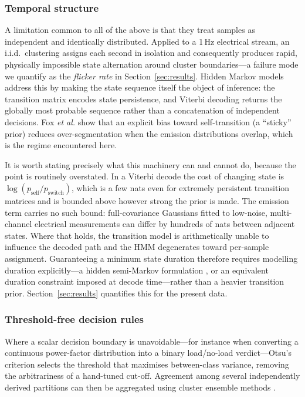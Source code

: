 \subsubsection{Temporal structure}
A limitation common to all of the above is that they treat samples as
independent and identically distributed. Applied to a 1\,Hz electrical
stream, an i.i.d.\ clustering assigns each second in isolation and
consequently produces rapid, physically impossible state alternation
around cluster boundaries---a failure mode we quantify as the
\emph{flicker rate} in Section~\ref{sec:results}. Hidden Markov models
\cite{rabiner1989tutorial} address this by making the state sequence
itself the object of inference: the transition matrix encodes state
persistence, and Viterbi decoding returns the globally most probable
sequence rather than a concatenation of independent decisions. Fox
\textit{et al.} \cite{fox2011sticky} show that an explicit bias toward
self-transition (a ``sticky'' prior) reduces over-segmentation when the
emission distributions overlap, which is the regime encountered here.

It is worth stating precisely what this machinery can and cannot do,
because the point is routinely overstated. In a Viterbi decode the cost
of changing state is $\log(p_{\text{self}}/p_{\text{switch}})$, which is
a few nats even for extremely persistent transition matrices and is
bounded above however strong the prior is made. The emission term
carries no such bound: full-covariance Gaussians fitted to low-noise,
multi-channel electrical measurements can differ by hundreds of nats
between adjacent states. Where that holds, the transition model is
arithmetically unable to influence the decoded path and the HMM
degenerates toward per-sample assignment. Guaranteeing a minimum state
duration therefore requires modelling duration explicitly---a hidden
semi-Markov formulation \cite{yu2010hsmm}, or an equivalent
duration constraint imposed at decode time---rather than a heavier
transition prior. Section~\ref{sec:results} quantifies this for the
present data.

\subsubsection{Threshold-free decision rules}
Where a scalar decision boundary is unavoidable---for instance when
converting a continuous power-factor distribution into a binary
load/no-load verdict---Otsu's criterion \cite{otsu1979threshold}
selects the threshold that maximises between-class variance, removing
the arbitrariness of a hand-tuned cut-off. Agreement among several
independently derived partitions can then be aggregated using cluster
ensemble methods \cite{strehl2002cluster}.


